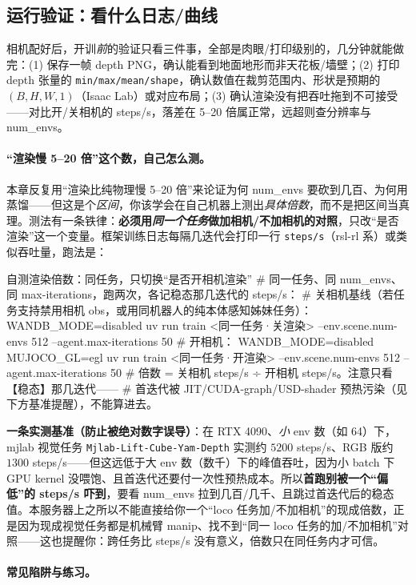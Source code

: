 \subsection{运行验证：看什么日志/曲线}
\label{sec:rlmc-vm-camera-verify}

相机配好后，开训\emph{前}的验证只看三件事，全部是肉眼/打印级别的，几分钟就能做完：(1) 保存一帧 depth PNG，确认能看到地面地形而非天花板/墙壁；(2) 打印 depth 张量的 \verb|min/max/mean/shape|，确认数值在裁剪范围内、形状是预期的 $(B,H,W,1)$（Isaac Lab）或对应布局；(3) 确认渲染没有把吞吐拖到不可接受——对比开/关相机的 steps/s，落差在 5--20 倍属正常，远超则查分辨率与 num\_envs。

\paragraph{“渲染慢 5--20 倍”这个数，自己怎么测。}本章反复用“渲染比纯物理慢 5--20 倍”来论证为何 num\_envs 要砍到几百、为何用蒸馏——但这是个\emph{区间}，你该学会在自己机器上测出\emph{具体倍数}，而不是把区间当真理。测法有一条铁律：\textbf{必须用\emph{同一个任务}做加相机/不加相机的对照}，只改“是否渲染”这一个变量。框架训练日志每隔几迭代会打印一行 \verb|steps/s|（rsl-rl 系）或类似吞吐量，跑法是：
\begin{codebox}[bash]{自测渲染倍数：同任务，只切换“是否开相机渲染”}
# 同一任务、同 num_envs、同 max-iterations，跑两次，各记稳态那几迭代的 steps/s：
# 关相机基线（若任务支持禁用相机 obs，或用同机器人的纯本体感知姊妹任务）：
WANDB_MODE=disabled uv run train <同一任务·关渲染> --env.scene.num-envs 512 --agent.max-iterations 50
# 开相机：
WANDB_MODE=disabled MUJOCO_GL=egl uv run train <同一任务·开渲染> --env.scene.num-envs 512 --agent.max-iterations 50
# 倍数 = 关相机 steps/s ÷ 开相机 steps/s。注意只看【稳态】那几迭代——
# 首迭代被 JIT/CUDA-graph/USD-shader 预热污染（见下方基准提醒），不能算进去。
\end{codebox}
\textbf{一条实测基准（防止被绝对数字误导）}：在 RTX 4090、\emph{小} env 数（如 64）下，mjlab 视觉任务 \verb|Mjlab-Lift-Cube-Yam-Depth| 实测约 $5200$ steps/s、RGB 版约 $1300$ steps/s——但这远低于大 env 数（数千）下的峰值吞吐，因为小 batch 下 GPU kernel 没喂饱、且首迭代还要付一次性预热成本。所以\textbf{首跑别被一个“偏低”的 steps/s 吓到}，要看 num\_envs 拉到几百/几千、且跳过首迭代后的稳态值。本服务器上之所以不能直接给你一个“loco 任务加/不加相机”的现成倍数，正是因为现成视觉任务都是机械臂 manip、找不到“同一 loco 任务的加/不加相机”对照——这也提醒你：跨任务比 steps/s 没有意义，倍数只在同任务内才可信。

\paragraph{常见陷阱与练习。}

